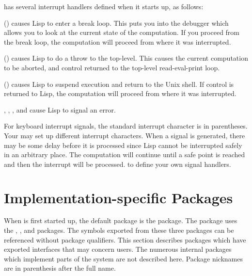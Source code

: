 \cmucl{} has several interrupt handlers defined when it starts up,
as follows:
\begin{Lentry}
  
\item[\code{SIGINT} (\ctrl{c})] causes Lisp to enter a break loop.
  This puts you into the debugger which allows you to look at the
  current state of the computation.  If you proceed from the break
  loop, the computation will proceed from where it was interrupted.
  
\item[\code{SIGQUIT} (\ctrl{L})] causes Lisp to do a throw to the
  top-level.  This causes the current computation to be aborted, and
  control returned to the top-level read-eval-print loop.
  
\item[\code{SIGTSTP} (\ctrl{z})] causes Lisp to suspend execution and
  return to the Unix shell.  If control is returned to Lisp, the
  computation will proceed from where it was interrupted.
  
\item[\code{SIGILL}, \code{SIGBUS}, \code{SIGSEGV}, and \code{SIGFPE}]
  cause Lisp to signal an error.
\end{Lentry}
For keyboard interrupt signals, the standard interrupt character is in
parentheses.  Your  may set up different interrupt
characters.  When a signal is generated, there may be some delay before
it is processed since Lisp cannot be interrupted safely in an arbitrary
place.  The computation will continue until a safe point is reached and
then the interrupt will be processed.   to define
your own signal handlers.


\section{Implementation-specific Packages}

When \cmucl{} is first started up, the default package is the
 package.  The  package
uses the , , and 
packages. The symbols exported from these three packages can be
referenced without package qualifiers. This section describes packages
which have exported interfaces that may concern users. The numerous
internal packages which implement parts of the system are not
described here. Package nicknames are in parenthesis after the full
name.

